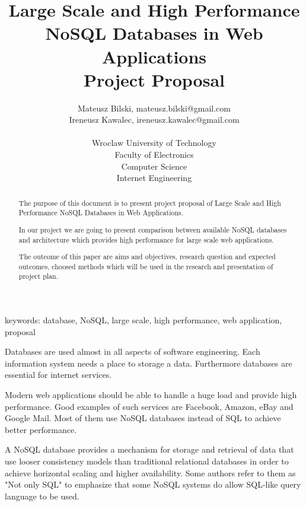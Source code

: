 \documentclass[times, 10pt,twocolumn]{article}
\begin{document}
  

\title{Large Scale and High Performance NoSQL Databases in Web Applications \\ Project Proposal}
\author{Mateusz Bilski, mateusz.bilski@gmail.com \\ Ireneusz Kawalec, ireneusz.kawalec@gmail.com \\ \\
Wroclaw University of Technology\\ Faculty of Electronics \\ Computer Science \\ Internet Engineering  \\  
} 

\maketitle
\thispagestyle{empty} 

\begin{abstract}  

The purpose of this document is to present project proposal of Large Scale and High Performance NoSQL Databases in Web Applications. 

In our project we are going to present comparison between available NoSQL databases and architecture which
provides high performance for large scale web applications.

The outcome of this paper are aims and objectives, research question and expected outcomes, choosed methods which will be used in the research
and presentation of project plan. 

\end{abstract} 

keywords: database, NoSQL, large scale, high performance, web application, proposal


Databases are used almost in all aspects of software engineering. Each 
information system needs a place to storage a data. Furthermore databases are essential for internet services.

Modern web applications should be able to handle a huge load and provide high performance. 
Good examples of such services are Facebook, Amazon, eBay and Google Mail. Most of them use NoSQL databases
instead of SQL to achieve better performance.

A NoSQL database provides a mechanism for storage and retrieval of data that use looser consistency models 
than traditional relational databases in order to achieve horizontal scaling and higher availability. Some authors 
refer to them as "Not only SQL" to emphasize that some NoSQL systems do allow SQL-like query language to be used.
\end{document}
